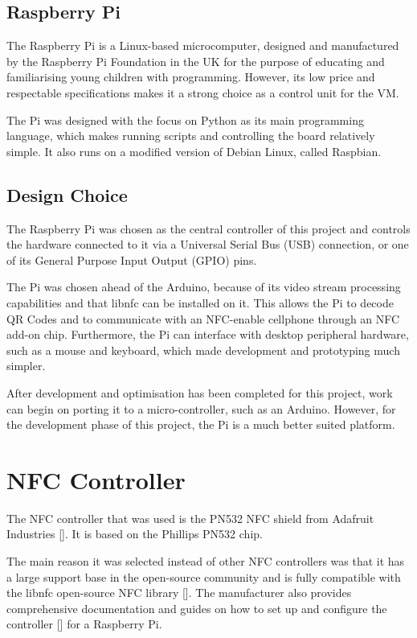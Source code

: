 \subsection{Raspberry Pi}
\label{sec:raspi}

The Raspberry Pi is a Linux-based microcomputer, designed and manufactured by the
Raspberry Pi Foundation in the UK for the purpose of educating and familiarising young
children with programming. However, its low price and respectable specifications makes it
a strong choice as a control unit for the VM.

The Pi was designed with the focus on Python as its main programming language, which makes
running scripts and controlling the board relatively simple. It also runs on a modified
version of Debian Linux, called Raspbian.

\subsection{Design Choice}

The Raspberry Pi was chosen as the central controller of this project and
controls the hardware connected to it via a Universal Serial Bus (USB) connection, or one of
its General Purpose Input Output (GPIO) pins.

The Pi was chosen ahead of the Arduino, because of its video stream processing
capabilities and that libnfc can be installed on it. This allows the Pi to decode QR
Codes and to communicate with an NFC-enable cellphone through an NFC add-on chip.
Furthermore, the Pi can interface with desktop peripheral hardware, such as a mouse and
keyboard, which made development and prototyping much simpler.

After development and optimisation has been completed for this project, work can begin on
porting it to a micro-controller, such as an Arduino. However, for the development phase
of this project, the Pi is a much better suited platform.

\section{NFC Controller}
\label{sec:nfc-controller}

The NFC controller that was used is the PN532 NFC shield from Adafruit Industries
[\cite{website:adafruit-nfc}]. It is based on the Phillips PN532 chip. 

The main reason it
was selected instead of other NFC controllers was that it has a large support base in the
open-source community and is fully compatible with the libnfc open-source NFC library
[\cite{website:libnfc-hardware}]. The manufacturer also provides
comprehensive documentation and guides on how to set up and configure the controller
[\cite{website:adafruit-tutorial}] for a Raspberry Pi.
 
